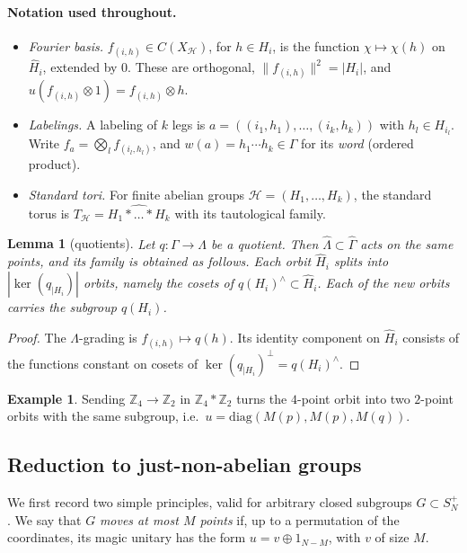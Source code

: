 \documentclass[11pt]{amsart}
\newtheorem{lemma}[theorem]{Lemma}
\theoremstyle{definition}
\newtheorem{example}[theorem]{Example}
\theoremstyle{remark}
\theoremstyle{plain}
\numberwithin{equation}{section}
\numberwithin{table}{section}
\newcommand{\Z}{\mathbb Z}
\begin{document}
\paragraph{Notation used throughout.}
\begin{itemize}
\item \emph{Fourier basis.} $f_{(i,h)}\in C(X_{\mathcal H})$, for $h\in H_i$, is the function $\chi\mapsto\chi(h)$ on $\widehat H_i$, extended by $0$. These are orthogonal, $\|f_{(i,h)}\|^2=|H_i|$, and $u(f_{(i,h)}\otimes1)=f_{(i,h)}\otimes h$.
\item \emph{Labelings.} A labeling of $k$ legs is $a=((i_1,h_1),\dots,(i_k,h_k))$ with $h_l\in H_{i_l}$. Write $f_a=\bigotimes_lf_{(i_l,h_l)}$, and $w(a)=h_1\cdots h_k\in\Gamma$ for its \emph{word} (ordered product).
\item \emph{Standard tori.} For finite abelian groups $\mathcal H=(H_1,\dots,H_k)$, the standard torus is $T_{\mathcal H}=\widehat{H_1*\dots*H_k}$ with its tautological family.
\end{itemize}

\begin{lemma}[quotients]\label{lem:quotient}
Let $q:\Gamma\to\Lambda$ be a quotient. Then $\widehat\Lambda\subset\widehat\Gamma$ acts on the same points, and its family is obtained as follows. Each orbit $\widehat H_i$ splits into $|\ker(q_{|H_i})|$ orbits, namely the cosets of $q(H_i)^\wedge\subset\widehat H_i$. Each of the new orbits carries the subgroup $q(H_i)$.
\end{lemma}

\begin{proof}
The $\Lambda$-grading is $f_{(i,h)}\mapsto q(h)$. Its identity component on $\widehat H_i$ consists of the functions constant on cosets of $\ker(q_{|H_i})^\perp=q(H_i)^\wedge$.
\end{proof}

\begin{example}
Sending $\Z_4\to\Z_2$ in $\Z_4*\Z_2$ turns the $4$-point orbit into two $2$-point orbits with the same subgroup, i.e.\ $u=\mathrm{diag}(M(p),M(p),M(q))$.
\end{example}

\subsection{Reduction to just-non-abelian groups}\label{sec:jna}

We first record two simple principles, valid for arbitrary closed subgroups $G\subset S_N^+$. We say that $G$ \emph{moves at most $M$ points} if, up to a permutation of the coordinates, its magic unitary has the form $u=v\oplus1_{N-M}$, with $v$ of size $M$.
\end{document}
